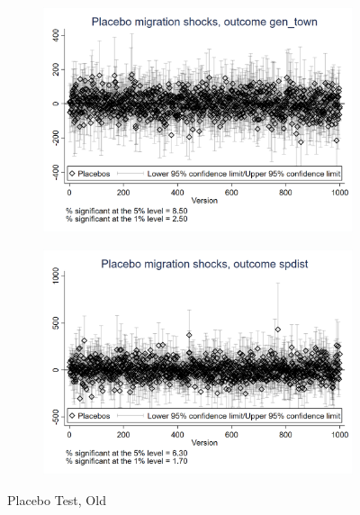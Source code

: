 \documentclass{article}
\begin{document}
\begin{figure}[htbp]
    \begin{subfigure}{0.3\textwidth}
        \includegraphics[width=\linewidth]{exhibits_old/figures/exogeneity_tests/D17_placebo_gen_town_urban.png}
        \label{fig:sub4}
    \end{subfigure}
    \begin{subfigure}{0.3\textwidth}
        \includegraphics[width=\linewidth]{exhibits_old/figures/exogeneity_tests/D17_placebo_spdist_urban.png}
        \label{fig:sub5}
    \end{subfigure}
    \caption{Placebo Test, Old}
    \label{fig:all}
\end{figure}
\clearpage
\end{document}
